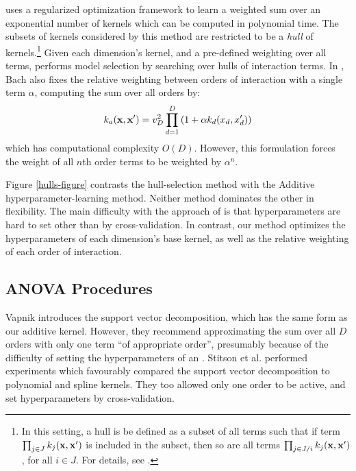 \citet{DBLP:journals/corr/abs-0909-0844} uses a regularized optimization framework to learn a weighted sum over an exponential number of kernels which can be computed in polynomial time.
The subsets of kernels considered by this method are restricted to be a \textit{hull} of kernels.\footnote{In this setting, a hull is be defined as a subset of all terms such that if term $\prod_{j \in J} k_j(\bf x, x')$ is included in the subset, then so are all terms $\prod_{j \in J / i} k_j(\bf x, x')$, for all $i \in J$.
For details, see \citep{DBLP:journals/corr/abs-0909-0844}.}
Given each dimension's kernel, and a pre-defined weighting over all terms, \HKL{} performs model selection by searching over hulls of interaction terms.
In \cite{DBLP:journals/corr/abs-0909-0844}, Bach also fixes the relative weighting between orders of interaction with a single term $\alpha$, computing the sum over all orders by:
\begin{equation}
\label{eqn:uniform}
k_{a}({\bf x, x'}) = v_D^2 \prod_{d=1}^D \left(1 + \alpha k_{d}(x_{d}, x_{d}') \right)
\end{equation}
which has computational complexity $O(D)$.  However, this formulation forces the weight of all $n$th order terms to be weighted by $\alpha^n$.

Figure \ref{hulls-figure} contrasts the \HKL{} hull-selection method with the Additive \gp{} hyperparameter-learning method. Neither method dominates the other in flexibility.
The main difficulty with the approach of \cite{DBLP:journals/corr/abs-0909-0844} is that hyperparameters are hard to set other than by cross-validation.
In contrast, our method optimizes the hyperparameters of each dimension's base kernel, as well as the relative weighting of each order of interaction. 


\subsection{ANOVA Procedures}

Vapnik \cite{vapnik1998statistical} introduces the support vector \ANOVA{} decomposition, which has the same form as our additive kernel.
However, they recommend approximating the sum over all $D$ orders with only one term ``of appropriate order'', presumably because of the difficulty of setting the hyperparameters of an \SVM{}.
Stitson et al.\cite{stitson1999support} performed experiments which favourably compared the support vector \ANOVA{} decomposition to polynomial and spline kernels.
They too allowed only one order to be active, and set hyperparameters by cross-validation.
%

